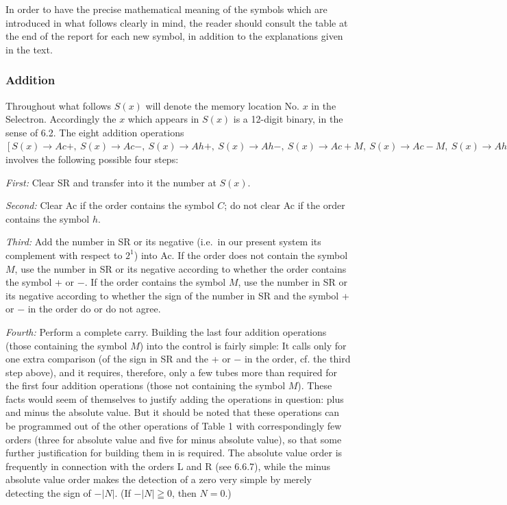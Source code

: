 \documentclass[12pt]{amsart}
\begin{document}
In order to have the precise mathematical meaning of the symbols which are introduced in what follows clearly in mind, the reader should consult the table at the end of the report for each new symbol, in addition to the explanations given in the text.

\subsubsection{Addition}
Throughout what follows $S(x)$ will denote the memory location No. $x$ in the Selectron. Accordingly the $x$ which appears in $S(x)$ is a 12-digit binary, in the sense of 6.2. The eight addition operations $[S(x) \rightarrow Ac +,\ S(x) \rightarrow Ac-,\ S(x) \rightarrow Ah+,\ S(x) \rightarrow Ah-,\ S(x) \rightarrow Ac + M,\ S(x) \rightarrow Ac- M,\ S(x) \rightarrow Ah + M,\ S(x) \rightarrow Ah - M]$ involves the following possible four steps:

\emph{First:} Clear SR and transfer into it the number at $S(x)$.

\emph{Second:} Clear Ac if the order contains the symbol $C$; do not clear Ac if the order contains the symbol $h$.

\emph{Third:} Add the number in SR or its negative (i.e.\ in our present system its complement with respect to $2^1$) into Ac. If the order does not contain the symbol $M$, use the number in SR or its negative according to whether the order contains the symbol + or $-$. If the order contains the symbol $M$, use the number in SR or its negative according to whether the sign of the number in SR and the symbol + or $-$ in the order do or do not agree.

\emph{Fourth:} Perform a complete carry. Building the last four addition operations (those containing the symbol $M$) into the control is fairly simple: It calls only for one extra comparison (of the sign in SR and the + or $-$ in the order, cf. the third step above), and it requires, therefore, only a few tubes more than required for the first four addition operations (those not containing the symbol $M$). These facts would seem of themselves to justify adding the operations in question: plus and minus the absolute value. But it should be noted that these operations can be programmed out of the other operations of Table 1 with correspondingly few orders (three for absolute value and five for minus absolute value), so that some further justification for building them in is required. The absolute value order is frequently in connection with the orders L and R (see 6.6.7), while the minus absolute value order makes the detection of a zero very simple by merely detecting the sign of $-|N|$. (If $-|N| \geqq 0$, then $N = 0$.)
\end{document}

